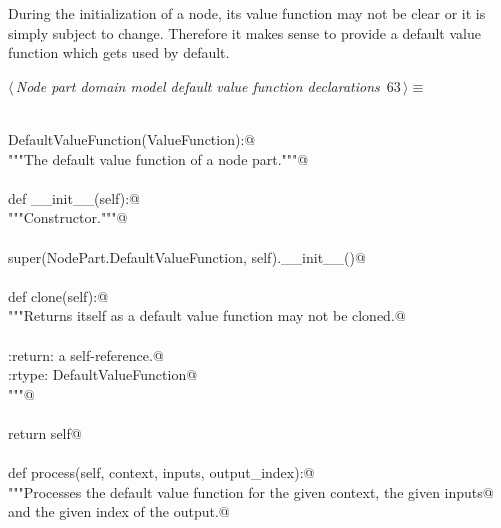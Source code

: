 \documentclass[
    a4paper,      %
    10pt,         %
    openright,    %
    notitlepage,  %
    parskip=half, %
]{scrreprt}       %
\theoremstyle{definition}                    %
\begin{document}
During the initialization of a node, its value function may not be clear or it
is simply subject to change. Therefore it makes sense to provide a default
value function which gets used by default.

\begin{flushleft} \small
\begin{minipage}{\linewidth}\label{scrap105}\raggedright\small
{} $\langle\,${\itshape Node part domain model default value function declarations}\nobreak\ {\footnotesize {63}}$\,\rangle\equiv$
\vspace{-1exm}
\begin{list}{}{} \item
\mbox{}\lstinline@@\\
\mbox{}\lstinline@class DefaultValueFunction(ValueFunction):@\\
\mbox{}\lstinline@    """The default value function of a node part."""@\\
\mbox{}\lstinline@@\\
\mbox{}\lstinline@    def __init__(self):@\\
\mbox{}\lstinline@        """Constructor."""@\\
\mbox{}\lstinline@@\\
\mbox{}\lstinline@        super(NodePart.DefaultValueFunction, self).__init__()@\\
\mbox{}\lstinline@@\\
\mbox{}\lstinline@    def clone(self):@\\
\mbox{}\lstinline@        """Returns itself as a default value function may not be cloned.@\\
\mbox{}\lstinline@@\\
\mbox{}\lstinline@        :return: a self-reference.@\\
\mbox{}\lstinline@        :rtype: DefaultValueFunction@\\
\mbox{}\lstinline@        """@\\
\mbox{}\lstinline@@\\
\mbox{}\lstinline@        return self@\\
\mbox{}\lstinline@@\\
\mbox{}\lstinline@    def process(self, context, inputs, output_index):@\\
\mbox{}\lstinline@        """Processes the default value function for the given context, the given inputs@\\
\mbox{}\lstinline@        and the given index of the output.@\\
\mbox{}\lstinline@@\\

\end{list}
\end{minipage}
\end{flushleft}
\end{document}
